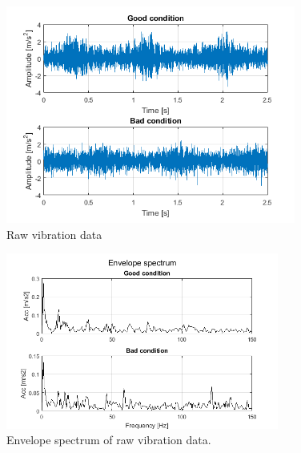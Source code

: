\documentclass[11pt]{article}
\begin{document}
\begin{figure}[!ht]
\begin{center}
\includegraphics[width=0.85\textwidth]{fig2.png}
\caption{Raw vibration data \label{f:raw}}
\end{center}
\end{figure}

\begin{figure}[!ht]
\begin{center}
\includegraphics[width=0.8\textwidth]{envelope_raw.png}
\caption{Envelope spectrum of raw vibration data. \label{f:envelope_raw}}
\end{center}
\end{figure}

\end{document}
